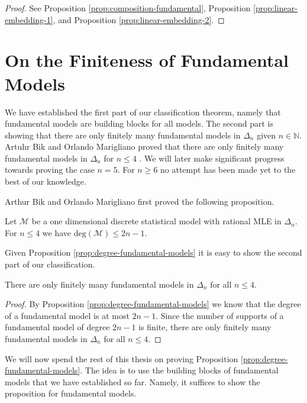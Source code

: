 \begin{proof}
    See Proposition \ref{prop:composition-fundamental}, Proposition \ref{prop:linear-embedding-1}, and Proposition \ref{prop:linear-embedding-2}.
\end{proof}

\section{On the Finiteness of Fundamental Models}

We have established the first part of our classification theorem, namely that fundamental models are building blocks for all models. The second part is showing that there are only finitely many fundamental models in \( \Delta_n \) given \( n \in \mathbb{N} \). Artuhr Bik and Orlando Marigliano proved that there are only finitely many fundamental models in \( \Delta_n \) for \( n \leq 4 \) \cite{bik2022classifying}. We will later make significant progress towards proving the case \( n = 5 \). For \( n \geq 6 \) no attempt has been made yet to the best of our knowledge.

Arthur Bik and Orlando Marigliano first proved the following proposition.

\begin{proposition}\label{prop:degree-fundamental-models}
    Let \( \mathcal{M} \) be a one dimensional discrete statistical model with rational MLE in \( \Delta_n \). For \(n \leq 4 \) we have \( \mathrm{deg}(\mathcal{M}) \leq 2n - 1\).
\end{proposition}

Given Proposition \ref{prop:degree-fundamental-models} it is easy to show the second part of our classification.

\begin{theorem}\label{thm:finiteness-fundamental-models}
    There are only finitely many fundamental models in \( \Delta_n \) for all \( n \leq 4 \).
\end{theorem}

\begin{proof}
    By Proposition \ref{prop:degree-fundamental-models} we know that the degree of a fundamental model is at most \( 2n - 1 \). Since the number of supports of a fundamental model of degree \( 2n - 1 \) is finite, there are only finitely many fundamental models in \( \Delta_n \) for all \( n \leq 4 \).
\end{proof}

We will now spend the rest of this thesis on proving Proposition \ref{prop:degree-fundamental-models}. The idea is to use the building blocks of fundamental models that we have established so far. Namely, it suffices to show the proposition for fundamental models.

